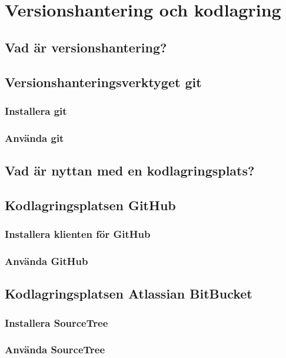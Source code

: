 

\chapter{Versionshantering och kodlagring}

\section{Vad är versionshantering?}

\section{Versionshanteringsverktyget git}

\subsection{Installera git}

\subsection{Använda git}

\section{Vad är nyttan med en kodlagringsplats?}

\section{Kodlagringsplatsen GitHub}

\subsection{Installera klienten för GitHub}

\subsection{Använda GitHub}


\section{Kodlagringsplatsen Atlassian BitBucket}

\subsection{Installera SourceTree}

\subsection{Använda SourceTree}
